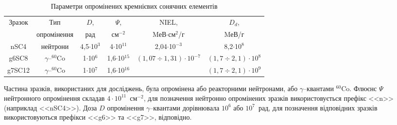 \begin{table}[b]
\caption{\label{tabSSCSample}Параметри опромінених кремнієвих сонячних елементів
}
\begin{tabular}{|c|c|c|c|c|c|}
\hline
\multirow{2}{*}{Зразок} &Тип&$D$,&$\Psi$, &NIEL,& $D_d$,  \\
&опромінення& рад& см$^{-2}$&MеВ$\cdot$см$^2$/г& MеВ/г \\
\hline
nSC4&нейтрони&4,5$\cdot$10$^3$&4$\cdot$10$^{11}$&2,04$\cdot$10$^{-3}$&8,2$\cdot$10$^{8}$\\ \hline
g6SC8&$\gamma$--$^{60}$Co&1$\cdot$10$^6$&1,6$\cdot$10$^{15}$&$(1,07\div1,31)\cdot10^{-7}$&$(1,7\div2,1)\cdot 10^{8}$\\
\cline{1-4}
\cline{6-6}
g7SC12&$\gamma$--$^{60}$Co&1$\cdot$10$^7$&1,6$\cdot$10$^{16}$&\cite{NIEL:Akkerman,NIEL:Messenger,NIEL:Allam}&$(1,7\div2,1)\cdot 10^9$\\ \hline
\end{tabular}
\end{table}

Частина зразків, використаних для досліджень, була опромінена або реакторними нейтронами, або $\gamma$--квантами $^{60}$Co.
Флюєнс $\Psi$ нейтронного опромінення складав $4\cdot10^{11}$~см$^{-2}$,
для позначення нейтронно опромінених зразків використовується префікс <<n>> (наприклад <<nSC4>>).
Доза $D$ опромінення $\gamma$--квантами дорівнювала $10^6$ або $10^7$~рад, для позначення відповідних зразків використовуються префікси <<g6>> та <<g7>>, відповідно.

